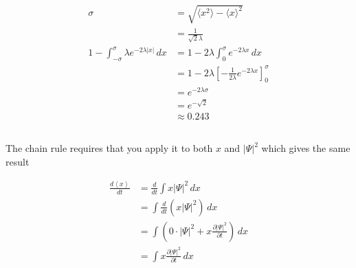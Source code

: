 \documentclass{article}
\newcommand{\ev}[1]{\left< #1 \right>}
\begin{document}
\begin{enumerate}
        \begin{align*}
          \sigma                                                    & = \sqrt{\langle x^2 \rangle - \langle x \rangle^2}                            \\
                                                                    & = \frac{1}{\sqrt{2} \lambda}                                                  \\
          1 - \int_{-\sigma}^\sigma \lambda e^{-2 \lambda |x|} \,dx & = 1 - 2 \lambda \int_0^\sigma e^{-2 \lambda x} \,d x                          \\
                                                                    & = 1 - 2 \lambda \left[ -\frac{1}{2 \lambda} e^{-2 \lambda x} \right]_0^\sigma \\
                                                                    & = e^{-2 \lambda \sigma}                                                       \\
                                                                    & = e^{-\sqrt{2}}                                                               \\
                                                                    & \approx 0.243
        \end{align*}
\end{enumerate}

\subsection{}

The chain rule requires that you apply it to both $x$ and $|\Psi|^2$ which gives the same result

\begin{align*}
  \frac{d \ev{x}}{d t} & = \frac{d}{d t} \int x |\Psi|^2 \,d x                                                 \\
                       & = \int \frac{d}{d t} (x |\Psi|^2) \,d x                                               \\
                       & = \int \left( 0 \cdot |\Psi|^2 + x \frac{\partial |\Psi|^2}{\partial t} \right) \,d x \\
                       & = \int x \frac{\partial |\Psi|^2}{\partial t} \,d x
\end{align*}

\setcounter{subsection}{7}
\subsection{}
\end{document}
